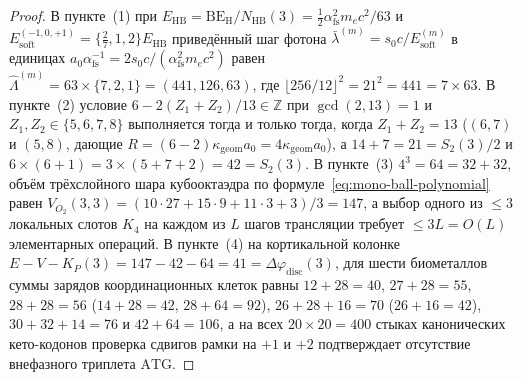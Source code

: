 \begin{proof}
В пункте~(1) при $E_{\mathrm{HB}} = \mathrm{BE}_{\mathrm{H}} / N_{\mathrm{HB}}(3) = \frac{1}{2}\alpha_{\mathrm{fs}}^2 m_e c^2 / 63$ и $E_{\mathrm{soft}}^{(-1,0,+1)} = \{\frac{2}{7}, 1, 2\}E_{\mathrm{HB}}$ приведённый шаг фотона $\bar{\lambda}^{(m)} = s_0 c / E_{\mathrm{soft}}^{(m)}$ в единицах $a_0 \alpha_{\mathrm{fs}}^{-1} = 2 s_0 c / (\alpha_{\mathrm{fs}}^2 m_e c^2)$ равен $\widehat{\Lambda}^{(m)} = 63 \times \{7, 2, 1\} = (441, 126, 63)$, где $\lfloor 256/12 \rfloor^2 = 21^2 = 441 = 7\times 63$. В пункте~(2) условие $6 - 2(Z_1 + Z_2)/13 \in \mathbb{Z}$ при $\gcd(2, 13) = 1$ и $Z_1, Z_2 \in \{5,6,7,8\}$ выполняется тогда и только тогда, когда $Z_1 + Z_2 = 13$ ($(6,7)$ и $(5,8)$, дающие $R = (6 - 2)\kappa_{\mathrm{geom}}a_0 = 4\kappa_{\mathrm{geom}}a_0$), а $14 + 7 = 21 = S_2(3)/2$ и $6\times(6+1) = 3\times(5+7+2) = 42 = S_2(3)$. В пункте~(3) $4^3 = 64 = 32 + 32$, объём трёхслойного шара кубооктаэдра по формуле~\eqref{eq:mono-ball-polynomial} равен $V_{O_2}(3,3) = (10\cdot 27 + 15\cdot 9 + 11\cdot 3 + 3)/3 = 147$, а выбор одного из $\le 3$ локальных слотов $K_4$ на каждом из $L$ шагов трансляции требует $\le 3L = O(L)$ элементарных операций. В пункте~(4) на кортикальной колонке $E - V - K_P(3) = 147 - 42 - 64 = 41 = \Delta\varphi_{\mathrm{disc}}(3)$, для шести биометаллов суммы зарядов координационных клеток равны $12 + 28 = 40$, $27 + 28 = 55$, $28 + 28 = 56$ ($14 + 28 = 42$, $28 + 64 = 92$), $26 + 28 + 16 = 70$ ($26 + 16 = 42$), $30 + 32 + 14 = 76$ и $42 + 64 = 106$, а на всех $20\times 20 = 400$ стыках канонических кето-кодонов проверка сдвигов рамки на $+1$ и $+2$ подтверждает отсутствие внефазного триплета $\mathrm{ATG}$.
\end{proof}

